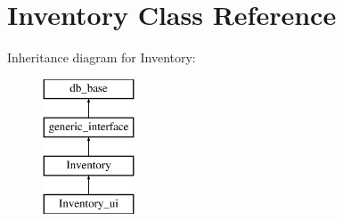 \hypertarget{class_inventory}{}\section{Inventory Class Reference}
\label{class_inventory}
Inheritance diagram for Inventory\+:\begin{figure}[H]
\begin{center}
\leavevmode
\includegraphics[height=4.000000cm]{da/d71/class_inventory}
\end{center}
\end{figure}
